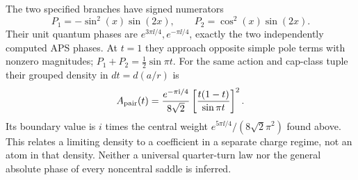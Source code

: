 The two specified branches have signed numerators
\[
 P_1=-\sin^2(x)\sin(2x),\qquad P_2=\cos^2(x)\sin(2x).
\]
Their unit quantum phases are \(e^{3\pi\ii/4},e^{-\pi\ii/4}\), exactly the two independently computed APS phases. At \(t=1\) they approach opposite simple pole terms with nonzero magnitudes; \(P_1+P_2=\frac12\sin\pi t\). For the same action and cap-class tuple their grouped density in \(dt=d(a/r)\) is
\[
 A_{\rm pair}(t)=\frac{e^{-\pi\mathrm i/4}}{8\sqrt2}
                   \left[\frac{t(1-t)}{\sin\pi t}\right]^2 .
\]
Its boundary value is \(i\) times the central weight \(e^{5\pi\ii/4}/(8\sqrt2\pi^2)\) found above. This relates a limiting density to a coefficient in a separate charge regime, not an atom in that density. Neither a universal quarter-turn law nor the general absolute phase of every noncentral saddle is inferred.

